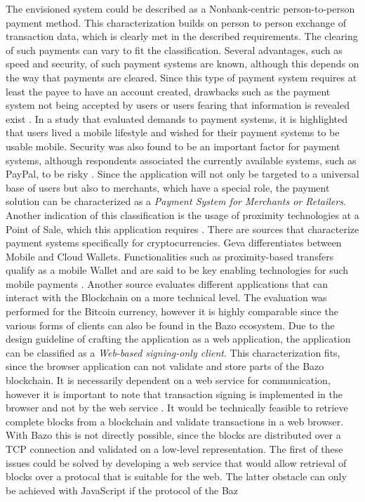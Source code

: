 The envisioned system could be described as a Nonbank-centric person-to-person payment method. This characterization builds on person to person exchange of transaction data, which is clearly met in the described requirements. The clearing of such payments can vary to fit the classification. %
Several advantages, such as speed and security, of such payment systems are known, although this depends on the way that payments are cleared. Since this type of payment system requires at least the payee to have an account created, drawbacks such as the payment system not being accepted by users or users fearing that information is revealed exist \cite{p2ppayments}. 
In a study that evaluated demands to payment systems, it is highlighted that users lived a mobile lifestyle and wished for their payment systems to be usable mobile. Security was also found to be an important factor for payment systems, although respondents associated the currently available systems, such as PayPal, to be risky \cite{p2ppadoption}.
Since the application will not only be targeted to a universal base of users but also to merchants, which have a special role, the payment solution can be characterized as a  \textit{Payment System for Merchants or Retailers}.
Another indication of this classification is the usage of proximity technologies at a Point of Sale, which this application requires \cite{p2ptypes}.
There are sources that characterize payment systems specifically for cryptocurrencies. Geva differentiates between Mobile and Cloud Wallets. Functionalities such as proximity-based transfers qualify as a mobile Wallet and are said to be key enabling technologies for such mobile payments \cite{bitcoinmobile}.
Another source evaluates different applications that can interact with the Blockchain on a more technical level. The evaluation was performed for the Bitcoin currency, however it is highly comparable since the various forms of clients can also be found in the Bazo ecosystem.
Due to the design guideline of crafting the application as a web application, the application can be classified as a \textit{ Web-based signing-only client}. This characterization fits, since the browser application can not validate and store parts of the Bazo blockchain. It is necessarily dependent on a web service for communication, however it is important to note that transaction signing is implemented in the browser and not by the web service \cite{bitcoinclients}. It would be technically feasible to retrieve complete blocks from a blockchain and validate transactions in a web browser. With Bazo this is not directly possible, since the blocks are distributed over a TCP connection and validated on a low-level representation. The first of these issues could be solved by developing a web service that would allow retrieval of blocks over a protocal that is suitable for the web. The latter obstacle can only be achieved with JavaScript if the protocol of the Baz


